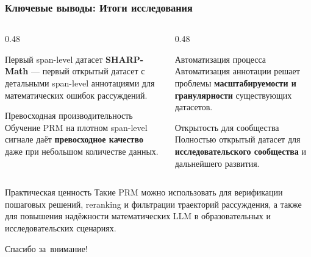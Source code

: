 \documentclass{beamer}
\begin{document}
\begin{frame}
  \frametitle{Ключевые выводы: Итоги исследования}
  \footnotesize
  
  \begin{columns}[T]
      \begin{column}{0.48\textwidth}
          \begin{block}{Первый span-level датасет}
              \textbf{SHARP-Math} — первый открытый датасет с детальными span-level аннотациями для математических ошибок рассуждений.
          \end{block}
          \begin{block}{Превосходная производительность}
              Обучение PRM на плотном span-level сигнале даёт \textbf{превосходное качество} даже при небольшом количестве данных.
          \end{block}
      \end{column}
      
      \begin{column}{0.48\textwidth}
          \begin{block}{Автоматизация процесса}
              Автоматизация аннотации решает проблемы \textbf{масштабируемости и гранулярности} существующих датасетов.
          \end{block}
          \begin{block}{Открытость для сообщества}
              Полностью открытый датасет для \textbf{исследовательского сообщества} и дальнейшего развития.
          \end{block}
      \end{column}
  \end{columns}
  
  \vspace{0.4em}
  \begin{block}{Практическая ценность}
      \scriptsize Такие PRM можно использовать для верификации пошаговых решений, reranking и фильтрации траекторий рассуждения, а также для повышения надёжности математических LLM в образовательных и исследовательских сценариях.
  \end{block}
\end{frame}

\begin{frame}
\begin{center}
{\Large Спасибо за~внимание!}
\end{center}
\end{frame}
\end{document}
